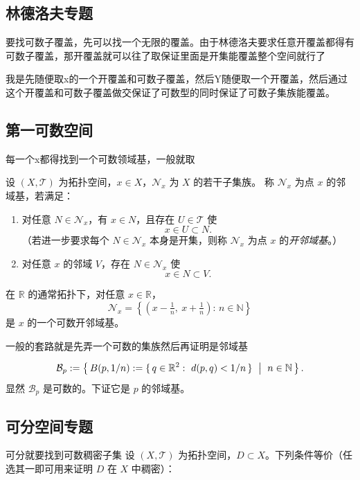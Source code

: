 \subsection{林德洛夫专题}
要找可数子覆盖，先可以找一个无限的覆盖。由于林德洛夫要求任意开覆盖都得有可数子覆盖，那开覆盖就可以往了取保证里面是开集能覆盖整个空间就行了
\begin{dxtips}
    我是先随便取x的一个开覆盖和可数子覆盖，然后Y随便取一个开覆盖，然后通过这个开覆盖和可数子覆盖做交保证了可数型的同时保证了可数子集族能覆盖。
\end{dxtips}
\subsection{第一可数空间}
每一个x都得找到一个可数领域基，一般就取
\begin{definition}[点 $x$ 的邻域基]
设 $(X,\mathcal T)$ 为拓扑空间，$x\in X$，$\mathcal N_x$ 为 $X$ 的若干子集族。
称 $\mathcal N_x$ 为点 $x$ 的邻域基，若满足：

\begin{enumerate}
  \item 对任意 $N\in\mathcal N_x$，有 $x\in N$，且存在 $U\in\mathcal T$ 使
  \[
  x\in U\subset N.
  \]
  （若进一步要求每个 $N\in\mathcal N_x$ 本身是开集，则称 $\mathcal N_x$
  为点 $x$ 的\emph{开邻域基}。）

  \item 对任意 $x$ 的邻域 $V$，存在 $N\in\mathcal N_x$ 使
  \[
  x\in N\subset V.
  \]
\end{enumerate}
\end{definition}

\begin{example}
在 $\mathbb{R}$ 的通常拓扑下，对任意 $x\in\mathbb{R}$，
\[
\mathcal N_x=\left\{\left(x-\tfrac1n,\ x+\tfrac1n\right):\, n\in\mathbb{N}\right\}
\]
是 $x$ 的一个可数开邻域基。
\end{example}
一般的套路就是先弄一个可数的集族然后再证明是邻域基
\begin{example}
\[
\mathcal B_p:=\left\{\,B(p,1/n):=\{\,q\in\mathbb R^2:\ d(p,q)<1/n\,\}\ \bigm|\ n\in\mathbb N\,\right\}.
\]
显然 $\mathcal B_p$ 是可数的。下证它是 $p$ 的邻域基。
\end{example}
\subsection{可分空间专题}
可分就要找到可数稠密子集
设 $(X,\mathcal T)$ 为拓扑空间，$D\subset X$。下列条件等价（任选其一即可用来证明 $D$ 在 $X$ 中稠密）：

